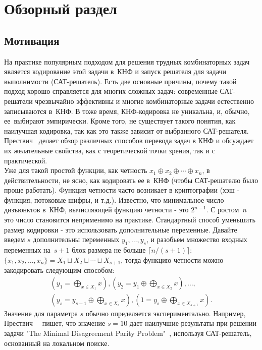 \section{Обзорный раздел}

\subsection{Мотивация}
На практике популярным подходом для решения трудных комбинаторных задач является кодирование этой задачи в~КНФ и запуск решателя для задачи выполнимости (САТ-решатель). 
Есть две основные причины, почему такой подход хорошо справляется для многих сложных задач: 
современные САТ-решатели  чрезвычайно эффективны и 
многие комбинаторные задачи естественно записываются в~КНФ. В тоже время, КНФ-кодировка не уникальна, и, обычно, ее~выбирают эмпирически. 
Кроме того, не существует такого понятия, как наилучшая кодировка, так как это также зависит от выбранного САТ-решателя. Прествич~\cite{DBLP:series/faia/Prestwich09} делает обзор различных способов перевода задач в КНФ и обсуждает их желательные свойства, как с теоретической точки зрения, так и с практической. \\
Уже для такой простой функции, как четность $x_1 \oplus x_2 \oplus \dotsb \oplus x_n$, 
в действительности, не ясно, как кодировать ее в~КНФ (чтобы САТ-решателю было проще работать). 
Функция четности часто возникает в криптографии (хэш - функция, потоковые шифры, и т.д.). 
Известно, что минимальное число дизъюнктов в~КНФ, вычисляющей функцию четности - это $2^{n-1}$. 
С ростом~$n$ это число становится неприменимо на практике. 
Стандартный способ уменьшить размер кодировки - это использовать дополнительные переменные. 
Давайте введем $s$ дополнительны переменных $y_1, \dotsc, y_s$, и разобьем множество входных переменных на~$s+1$ блок размера не больше $\lceil n/(s+1) \rceil$: $\{x_1, x_2, \dotsc, x_n\}=X_1 \sqcup X_2 \sqcup \dotsb \sqcup X_{s+1}$, 
тогда функцию четности можно закодировать следующим способом: 
\begin{multline}\label{eq:blocks}
	\left(y_1=\bigoplus_{x \in X_1}x\right),
	\left(y_2=y_1 \oplus \bigoplus_{x \in X_2}x\right), \dotsc,\\
	\left(y_s=y_{s-1} \oplus \bigoplus_{x \in X_s}x\right),
	\left(1=y_s \oplus \bigoplus_{x \in X_{s+1}}x\right).
\end{multline}
Значение для параметра $s$ обычно определяется экспериментально. Например, Прествич~~\cite{DBLP:series/faia/Prestwich09} пишет, что значение $s = 10$ дает наилучшие результаты при решении задачи "The Minimal Disagreement Parity Problem"\ \cite{Crawford1995TheMD}, используя САТ-решатель, основанный на локальном поиске.

